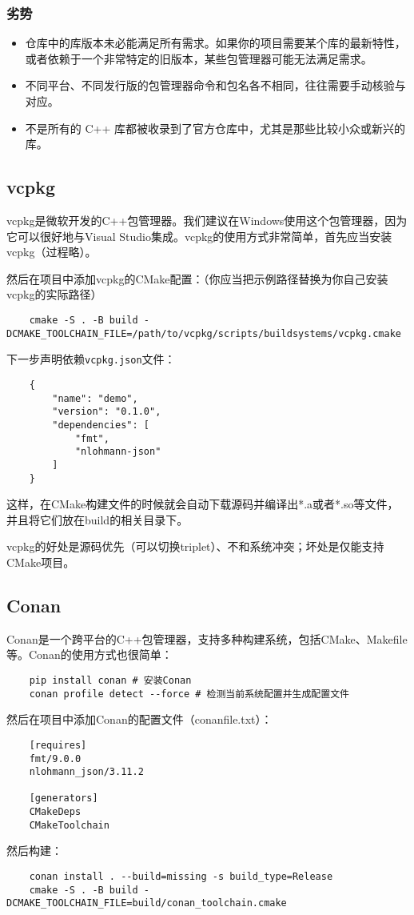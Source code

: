 \documentclass[../main]{subfiles}
\begin{document}
\subsubsection{劣势}
\begin{itemize}
    \item 仓库中的库版本未必能满足所有需求。如果你的项目需要某个库的最新特性，或者依赖于一个非常特定的旧版本，某些包管理器可能无法满足需求。
    \item 不同平台、不同发行版的包管理器命令和包名各不相同，往往需要手动核验与对应。
    \item 不是所有的 C++ 库都被收录到了官方仓库中，尤其是那些比较小众或新兴的库。
\end{itemize}

\subsection{vcpkg}

vcpkg是微软开发的C++包管理器。我们建议在Windows使用这个包管理器，因为它可以很好地与Visual Studio集成。vcpkg的使用方式非常简单，首先应当安装vcpkg（过程略）。

然后在项目中添加vcpkg的CMake配置：（你应当把示例路径替换为你自己安装vcpkg的实际路径）
\begin{lstlisting}
    cmake -S . -B build -DCMAKE_TOOLCHAIN_FILE=/path/to/vcpkg/scripts/buildsystems/vcpkg.cmake
\end{lstlisting}
下一步声明依赖\texttt{vcpkg.json}文件：
\begin{lstlisting}
    {
        "name": "demo",
        "version": "0.1.0",
        "dependencies": [
            "fmt",
            "nlohmann-json"
        ]
    }
\end{lstlisting}
这样，在CMake构建文件的时候就会自动下载源码并编译出*.a或者*.so等文件，并且将它们放在build的相关目录下。

vcpkg的好处是源码优先（可以切换triplet）、不和系统冲突；坏处是仅能支持CMake项目。

\subsection{Conan}

Conan是一个跨平台的C++包管理器，支持多种构建系统，包括CMake、Makefile等。Conan的使用方式也很简单：
\begin{lstlisting}
    pip install conan # 安装Conan
    conan profile detect --force # 检测当前系统配置并生成配置文件
\end{lstlisting}
然后在项目中添加Conan的配置文件（conanfile.txt）：
\begin{lstlisting}
    [requires]
    fmt/9.0.0
    nlohmann_json/3.11.2

    [generators]
    CMakeDeps
    CMakeToolchain
\end{lstlisting}
然后构建：
\begin{lstlisting}
    conan install . --build=missing -s build_type=Release
    cmake -S . -B build -DCMAKE_TOOLCHAIN_FILE=build/conan_toolchain.cmake
\end{lstlisting}
\end{document}
